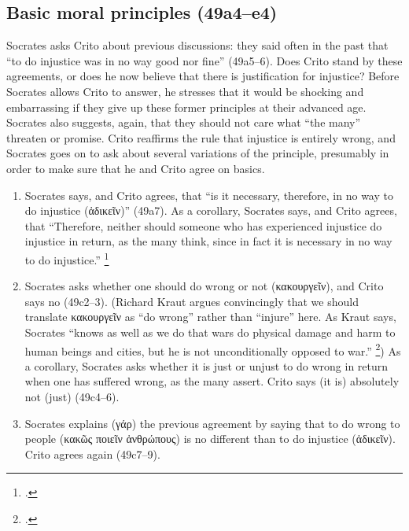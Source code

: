 \documentclass[12pt,letterpaper]{article}
\begin{document}
\subsection*{Basic moral principles (49a4--e4)}

Socrates asks Crito about previous discussions: they said often in the past that ``to do injustice was in no way good nor fine'' (49a5--6).
Does Crito stand by these agreements, or does he now believe that there is justification for injustice?
Before Socrates allows Crito to answer, he stresses that it would be shocking and embarrassing if they give up these former principles at their advanced age.
Socrates also suggests, again, that they should not care what ``the many'' threaten or promise.
Crito reaffirms the rule that injustice is entirely wrong, and Socrates goes on to ask about several variations of the principle, presumably in order to make sure that he and Crito agree on basics.

\begin{enumerate}
    \item Socrates says, and Crito agrees, that ``is it necessary, therefore, in no way to do injustice (\textgreek{ἀδικεῖν})'' (49a7).
        As a corollary, Socrates says, and Crito agrees, that ``Therefore, neither should someone who has experienced injustice do injustice in return, as the many think, since in fact it is necessary in no way to do injustice.''%
        \footcite[I call the second claim a ``corollary'' following][25--26]{kraut-socrates-state-1984}
    \item Socrates asks whether one should do wrong or not (\textgreek{κακουργεῖν}), and Crito says no (49c2--3).
        (Richard Kraut argues convincingly that we should translate \textgreek{κακουργεῖν} as ``do wrong'' rather than ``injure'' here.
        As Kraut says, Socrates ``knows as well as we do that wars do physical damage and harm to human beings and cities, but he is not unconditionally opposed to war.''%
        \footcite[][26, note 2]{kraut-socrates-state-1984}) As a corollary, Socrates asks whether it is just or unjust to do wrong in return when one has suffered wrong, as the many assert.
        Crito says (it is) absolutely not (just) (49c4--6).
    \item Socrates explains (\textgreek{γάρ}) the previous agreement by saying that to do wrong to people (\textgreek{κακῶς ποιεῖν ἀνθρώπους}) is no different than to do injustice (\textgreek{ἀδικεῖν}).
        Crito agrees again (49c7--9).
\end{enumerate}
\end{document}
